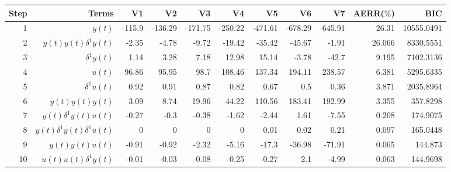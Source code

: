 \begin{tabular}{rrrrrrrrrrr}
Step & Terms & V1 & V2 & V3 & V4 & V5 & V6 & V7 & AERR($\%$) & BIC \\ 
\hline 
1 & $y(t)$ & -115.9 & -136.29 & -171.75 & -250.22 & -471.61 & -678.29 & -645.91 & 26.31 & 10555.0491 \\ 
2 & $y(t)y(t)\delta^1 y(t)$ & -2.35 & -4.78 & -9.72 & -19.42 & -35.42 & -45.67 & -1.91 & 26.066 & 8330.5551 \\ 
3 & $\delta^1 y(t)$ & 1.14 & 3.28 & 7.18 & 12.98 & 15.14 & -3.78 & -42.7 & 9.195 & 7102.3136 \\ 
4 & $u(t)$ & 96.86 & 95.95 & 98.7 & 108.46 & 137.34 & 194.11 & 238.57 & 6.381 & 5295.6335 \\ 
5 & $\delta^1 u(t)$ & 0.92 & 0.91 & 0.87 & 0.82 & 0.67 & 0.5 & 0.36 & 3.871 & 2035.8964 \\ 
6 & $y(t)y(t)y(t)$ & 3.09 & 8.74 & 19.96 & 44.22 & 110.56 & 183.41 & 192.99 & 3.355 & 357.8298 \\ 
7 & $y(t)\delta^1 y(t)u(t)$ & -0.27 & -0.3 & -0.38 & -1.62 & -2.44 & 1.61 & -7.55 & 0.208 & 174.9075 \\ 
8 & $y(t)\delta^1 y(t)\delta^1 u(t)$ & 0 & 0 & 0 & 0 & 0.01 & 0.02 & 0.21 & 0.097 & 165.0448 \\ 
9 & $y(t)y(t)u(t)$ & -0.91 & -0.92 & -2.32 & -5.16 & -17.3 & -36.98 & -71.91 & 0.065 & 144.873 \\ 
10 & $u(t)u(t)\delta^1 y(t)$ & -0.01 & -0.03 & -0.08 & -0.25 & -0.27 & 2.1 & -4.99 & 0.063 & 144.9698 \\ 
\hline 
\end{tabular}